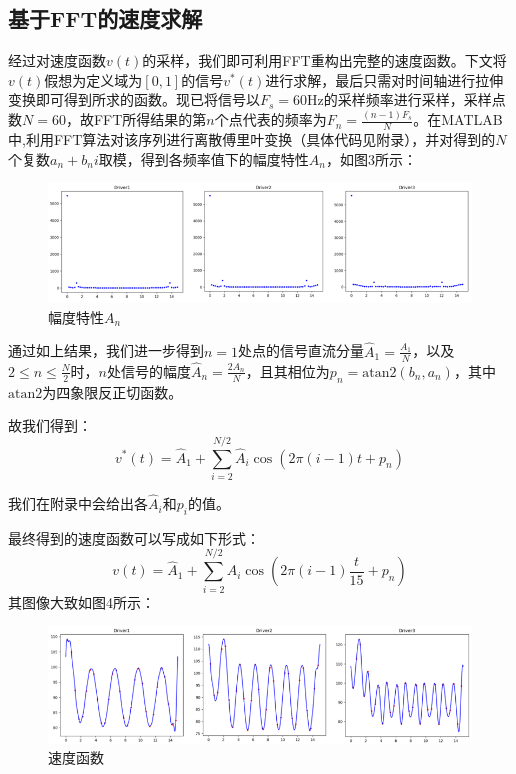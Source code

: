 \documentclass[bwprint]{cumcmthesis}
\begin{document}
        \subsection{基于FFT的速度求解}
        经过对速度函数$v(t)$的采样，我们即可利用FFT重构出完整的速度函数。下文将$v(t)$假想为定义域为$[0,1]$的信号$v^*(t)$进行求解，最后只需对时间轴进行拉伸变换即可得到所求的函数。现已将信号以$F_s=60\mathrm{Hz}$的采样频率进行采样，采样点数$N=60$，故FFT所得结果的第$n$个点代表的频率为$F_n=\frac{(n-1)F_s}{N}$。在MATLAB中,利用FFT算法对该序列进行离散傅里叶变换（具体代码见附录），并对得到的$N$个复数$a_n+b_ni$取模，得到各频率值下的幅度特性$A_n$，如图3所示：
        \begin{figure}[htbp]
            \centering
            \includegraphics[width=1\linewidth]{mod.png}
            \caption{幅度特性$A_n$}
        \end{figure}

        通过如上结果，我们进一步得到$n=1$处点的信号直流分量$\widehat{A}_1=\frac{A_1}{N}$，以及$2\leq n\leq \frac{N}{2}$时，$n$处信号的幅度$\widehat{A}_n=\frac{2A_n}{N}$，且其相位为$p_n=\mathrm{atan2}(b_n,a_n)$，其中$\mathrm{atan2}$为四象限反正切函数。

        故我们得到： 
        \begin{equation*}
            v^*(t)=\widehat{A}_1 + \sum_{i=2}^{N/2}\widehat{A}_i\cos(2\pi (i-1)t+p_n)
        \end{equation*}
        
        我们在附录中会给出各$\widehat{A}_i$和$p_i$的值。

        最终得到的速度函数可以写成如下形式：
        \begin{equation*}
            v(t)=\widehat{A}_1 + \sum_{i=2}^{N/2}\widehat{A}_i\cos(2\pi (i-1) \frac{t}{15}+p_n)
        \end{equation*}
        其图像大致如图4所示：
        \begin{figure}[htbp]
            \centering

            \includegraphics[width=1\linewidth]{v.png}
            \caption{速度函数}
        \end{figure}
\end{document}
